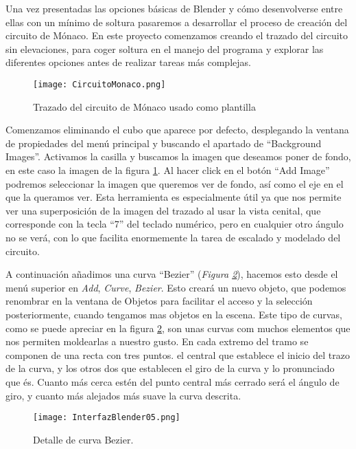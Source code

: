 Una vez presentadas las opciones básicas de Blender y cómo desenvolverse entre ellas con un mínimo de soltura pasaremos a desarrollar el proceso de creación del circuito de Mónaco. En este proyecto comenzamos creando el trazado del circuito  sin elevaciones, para coger soltura en el manejo del programa y explorar las diferentes opciones antes de realizar tareas más complejas.

\begin{figure}[ht]
	\centering
	\texttt{[image: CircuitoMonaco.png]}
	\caption{Trazado del circuito de Mónaco usado como plantilla} \label{fig:circuitomonaco}
\end{figure}

Comenzamos eliminando el cubo que aparece por defecto, desplegando la ventana de propiedades del menú principal y buscando el apartado de “Background Images”. Activamos la casilla y buscamos la imagen que deseamos poner de fondo, en este caso la imagen de la figura  \ref{fig:circuitomonaco}. Al hacer click en el botón “Add Image” podremos seleccionar la imagen que queremos ver de fondo, así como el eje en el que la queramos ver. Esta herramienta es especialmente útil ya que  nos permite ver una superposición de la imagen del trazado al usar la vista cenital, que corresponde con la tecla “7” del teclado numérico, pero en cualquier otro ángulo no se verá, con lo que facilita enormemente la tarea de escalado y modelado del circuito.

A continuación añadimos una curva “Bezier” (\textit{Figura \ref{fig:interfazblender05}}), hacemos esto desde el menú superior en \textit{Add}, \textit{Curve}, \textit{Bezier}. Esto creará un nuevo objeto, que podemos renombrar en la ventana de Objetos para facilitar el acceso y la selección posteriormente, cuando tengamos mas objetos en la escena. Este tipo de curvas, como se puede apreciar en la figura \ref{fig:interfazblender05}, son unas curvas com muchos elementos que nos permiten moldearlas a nuestro gusto. En cada extremo del tramo se componen de una recta con tres puntos. el central que establece el inicio del trazo de la curva, y los otros dos que establecen el giro de la curva y lo pronunciado que és. Cuanto más cerca estén del punto central más cerrado será el ángulo de giro, y cuanto más alejados más suave la curva descrita.

\begin{figure}[h]
	\centering
	\texttt{[image: InterfazBlender05.png]}
	\caption{Detalle de curva Bezier.} \label{fig:interfazblender05}
\end{figure}

